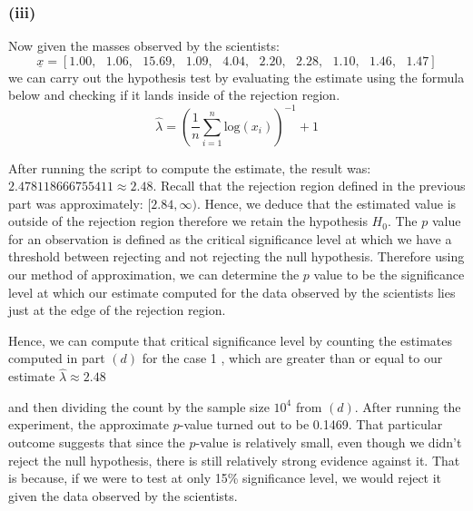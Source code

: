 \documentclass[12pt]{article}
\begin{document}
\subsubsection*{(iii)}
Now given the masses observed by the scientists:
\[ \underline{x} = [1.00,\text{ } 1.06,\text{ } 15.69,\text{ } 1.09,\text{ } 4.04,\text{ } 2.20,\text{ } 2.28,\text{ } 1.10,\text{ } 1.46,\text{ } 1.47] \]
we can carry out the hypothesis test by evaluating the estimate using the
formula below and checking if it lands inside of the rejection region. 
\[ \hat{\lambda} = \left(\frac{1}{n} \sum_{i = 1}^{n} \text{log} (x_i) \right)^{-1} + 1  \]

After running the script to compute the estimate, the result was: $2.478118666755411
\approx 2.48. $ Recall that the rejection region defined in 
the previous part was approximately: $[ 2.84, \infty )$. 
Hence, we deduce that the estimated value is outside of the rejection region therefore we retain the hypothesis $ H_0 $.
The $p$ value for an observation is defined as the critical significance 
level at which we have a threshold between rejecting and not rejecting the
null hypothesis. Therefore using our method of approximation, we can 
determine the $p$ value to be the significance level at which our estimate
computed for the data observed by the scientists lies just at the edge of the rejection region. 

Hence, we can compute that critical significance
level by counting the estimates computed in part $(d)$ for the case 1 
, which are greater than or equal to our estimate $ \hat{\lambda} \approx 2.48 $ 

and then dividing the count by the sample size $10^4$ from $(d)$. 
After running the experiment,
the approximate $p$-value turned out to be 0.1469. 
That particular outcome suggests that since the $p$-value is relatively small, even though we didn't reject the null hypothesis, 
there is still relatively strong evidence against it.
That is because, if we were to test at only 15\% significance level, 
we would reject it given the data observed by the scientists.  
\end{document}
